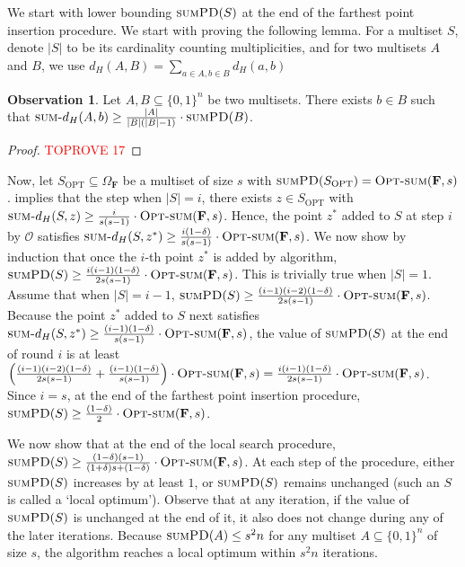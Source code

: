 \documentclass[11pt, letterpaper]{article}
\theoremstyle{definition}
\newtheorem{observation}[theorem]{Observation}
\newcommand{\f}{\mathbf{F}}
\newcommand{\Om}{\Omega_{\f}}
\newcommand{\SPD}{\textsc{sumPD}}
\newcommand{\sumd}{\textsc{sum-}d_H}
\newcommand{\opts}{\textsc{Opt-sum}}
\newcommand{\Sopt}{S_{\text{OPT}}}
\begin{document}
 \medskip \noindent
 We start with lower bounding $\SPD(S)$ at the end of the farthest point insertion procedure. We start with proving the following lemma. For a multiset $S$, denote $|S|$ to be its cardinality counting multiplicities, and for two multisets $A$ and $B$, we use $d_H(A,B)=\sum_{a \in A, b \in B} d_H(a,b)$
 \begin{observation} \label{obs:multisettriangle}
     Let $A,B \subseteq \{0,1\}^n$ be two multisets. There exists $b \in B$ such that $\sumd(A,b) \geq \frac{|A|}{|B|(|B|-1)} \cdot \SPD(B)$.
 \end{observation}
 \begin{proof}\textcolor{red}{TOPROVE 17}\end{proof}
 \noindent
 Now, let $\Sopt \subseteq \Om$ be a multiset of size $s$ with $\SPD(\Sopt)= \opts(\f,s)$.  implies that the step when $|S|=i$, there exists $z \in \Sopt$ with $\sumd(S, z) \geq \frac{i}{s(s-1)} \cdot \opts(\f,s)$. Hence, the point $z^*$ added to $S$ at step $i$ by $\mathcal{O}$ satisfies $\sumd(S,z^*) \geq \frac{i(1-\delta)}{s(s-1)} \cdot \opts(\f,s)$. We now show by induction that once the $i$-th point $z^*$ is added by algorithm, $\SPD(S) \geq \frac{i(i-1)(1-\delta)}{2s(s-1)} \cdot \opts(\f,s)$. This is trivially true when $|S|=1$. Assume that when $|S|=i-1$, $\SPD(S) \geq \frac{(i-1)(i-2)(1-\delta)}{2s(s-1)} \cdot \opts(\f,s)$. Because the point $z^*$ added to $S$ next satisfies $\sumd(S,z^*) \geq \frac{(i-1)(1-\delta)}{s(s-1)} \cdot \opts(\f,s)$, the value of $\SPD(S)$ at the end of round $i$ is at least $\left(\frac{(i-1)(i-2)(1-\delta)}{2s(s-1)} +  \frac{(i-1)(1-\delta)}{s(s-1)} \right) \cdot \opts(\f,s) = \frac{i(i-1)(1-\delta)}{2s(s-1)} \cdot \opts(\f,s)$. Since $i=s$, at the end of the farthest point insertion procedure, $\SPD(S) \geq \frac{(1-\delta)}{2} \cdot \opts(\f,s)$. 
 
 \medskip \noindent
 We now show that at the end of the local search procedure, $\SPD(S) \geq \frac{(1-\delta)(s-1)}{(1+\delta)s+(1-\delta)}\cdot \opts(\f,s)$. At each step of the procedure, either $\SPD(S)$ increases by at least $1$, or $\SPD(S)$ remains unchanged (such an $S$ is called a `local optimum'). Observe that at any iteration, if the value of $\SPD(S)$ is unchanged at the end of it, it also does not change during any of the later iterations. Because $\SPD(A) \leq s^2n$ for any multiset $A \subseteq \{0,1\}^n$ of size $s$, the algorithm reaches a local optimum within $s^2 n$ iterations.
\end{document}
